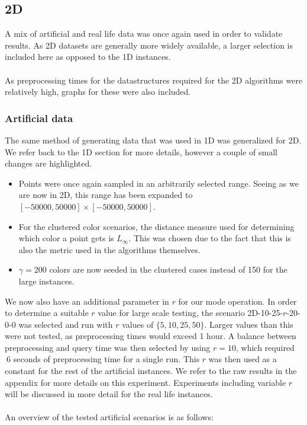 \documentclass{article}
\begin{document}
\subsection{2D}
A mix of artificial and real life data was once again used in order to validate
results. As 2D datasets are generally more widely available, a larger selection
is included here as opposed to the 1D instances. \\\\ As preprocessing times
for the datastructures required for the 2D algorithms were relatively high,
graphs for these were also included. \subsubsection*{Artificial data} The same
method of generating data that was used in 1D was generalized for 2D. We refer
back to the 1D section for more details, however a couple of small changes are
highlighted.
\begin{itemize}
    \item Points were once again sampled in an arbitrarily selected range. Seeing as we
          are now in 2D, this range has been expanded to $[-50000, 50000] \times [-50000,
                  50000]$.
    \item For the clustered color scenarios, the distance measure used for determining
          which color a point gets is $L_\infty$. This was chosen due to the fact that
          this is also the metric used in the algorithms themselves.
    \item $\gamma=200$ colors are now seeded in the clustered cases instead of 150 for the large instances.
\end{itemize}
We now also have an additional parameter in $r$ for our mode operation. In order to determine a suitable $r$ value for large scale testing, the scenario 2D-10-25-$r$-20-0-0 was selected and run with $r$ values of $\{ 5, 10, 25, 50 \}$. Larger values than this were not tested, as preprocessing times would exceed 1 hour. A balance between preprocessing and query time was then selected by using $r=10$, which required $~6$ seconds of preprocessing time for a single run. This $r$ was then used as a constant for the rest of the artificial instances. We refer to the raw results in the appendix for more details on this experiment. Experiments including variable $r$ will be discussed in more detail for the real life instances. \\\\
An overview of the tested artificial scenarios is as follows: \\
\end{document}
